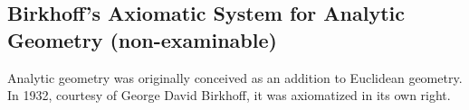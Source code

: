 \begin{exercises}
% 	
\end{exercises}

\clearpage


\subsection{Birkhoff's Axiomatic System for Analytic Geometry (non-examinable)}

Analytic geometry was originally conceived as an addition to Euclidean geometry. In 1932, courtesy of George David Birkhoff, it was axiomatized in its own right. %


